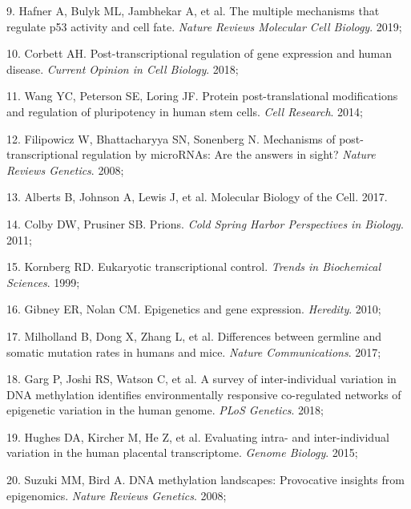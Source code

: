 \documentclass[11pt,twoside]{bristolthesis}
\newenvironment{cslreferences}%
  {}%
  {\par}
\begin{document}
\begin{cslreferences}
\leavevmode\hypertarget{ref-Hafner2019}{}%
9. Hafner A, Bulyk ML, Jambhekar A, et al. The multiple mechanisms that regulate p53 activity and cell fate. \emph{Nature Reviews Molecular Cell Biology}. 2019;

\leavevmode\hypertarget{ref-Corbett2018}{}%
10. Corbett AH. Post-transcriptional regulation of gene expression and human disease. \emph{Current Opinion in Cell Biology}. 2018;

\leavevmode\hypertarget{ref-Wang2014}{}%
11. Wang YC, Peterson SE, Loring JF. Protein post-translational modifications and regulation of pluripotency in human stem cells. \emph{Cell Research}. 2014;

\leavevmode\hypertarget{ref-Filipowicz2008}{}%
12. Filipowicz W, Bhattacharyya SN, Sonenberg N. Mechanisms of post-transcriptional regulation by microRNAs: Are the answers in sight? \emph{Nature Reviews Genetics}. 2008;

\leavevmode\hypertarget{ref-Alberts2017}{}%
13. Alberts B, Johnson A, Lewis J, et al. Molecular Biology of the Cell. 2017.

\leavevmode\hypertarget{ref-Colby2011}{}%
14. Colby DW, Prusiner SB. Prions. \emph{Cold Spring Harbor Perspectives in Biology}. 2011;

\leavevmode\hypertarget{ref-Kornberg1999}{}%
15. Kornberg RD. Eukaryotic transcriptional control. \emph{Trends in Biochemical Sciences}. 1999;

\leavevmode\hypertarget{ref-Gibney2010}{}%
16. Gibney ER, Nolan CM. Epigenetics and gene expression. \emph{Heredity}. 2010;

\leavevmode\hypertarget{ref-Milholland2017}{}%
17. Milholland B, Dong X, Zhang L, et al. Differences between germline and somatic mutation rates in humans and mice. \emph{Nature Communications}. 2017;

\leavevmode\hypertarget{ref-Garg2018}{}%
18. Garg P, Joshi RS, Watson C, et al. A survey of inter-individual variation in DNA methylation identifies environmentally responsive co-regulated networks of epigenetic variation in the human genome. \emph{PLoS Genetics}. 2018;

\leavevmode\hypertarget{ref-Hughes2015}{}%
19. Hughes DA, Kircher M, He Z, et al. Evaluating intra- and inter-individual variation in the human placental transcriptome. \emph{Genome Biology}. 2015;

\leavevmode\hypertarget{ref-Suzuki2008}{}%
20. Suzuki MM, Bird A. DNA methylation landscapes: Provocative insights from epigenomics. \emph{Nature Reviews Genetics}. 2008;


\end{cslreferences}
\end{document}
